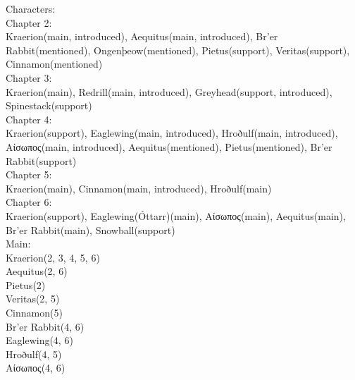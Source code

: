 



Characters:\\[1cm]
Chapter 2:\\[0.1cm]
Kraerion(main, introduced),
Aequitus(main, introduced),
Br'er Rabbit(mentioned),
Ongenþeow(mentioned),
Pietus(support),
Veritas(support),
Cinnamon(mentioned)\\[0.1cm]

Chapter 3:\\[0.1cm]
Kraerion(main),
Redrill(main, introduced),
Greyhead(support, introduced),
Spinestack(support)\\[1cm]

Chapter 4:\\[0.1cm]
Kraerion(support),
Eaglewing(main, introduced), 
Hroðulf(main, introduced), 
Αίσωπος(main, introduced),
Aequitus(mentioned),
Pietus(mentioned),
Br'er Rabbit(support)\\[0.1cm]

Chapter 5:\\[0.1cm]
Kraerion(main),
Cinnamon(main, introduced),
Hroðulf(main)\\[0.1cm]

Chapter 6:\\[0.1cm]
Kraerion(support),
Eaglewing(Óttarr)(main),
Αίσωπος(main),
Aequitus(main),
Br'er Rabbit(main),
Snowball(support)\\[0.1cm]

Main: \\[0.1cm]
Kraerion(2, 3, 4, 5, 6)\\
Aequitus(2, 6)\\
Pietus(2)\\
Veritas(2, 5)\\
Cinnamon(5)\\
Br'er Rabbit(4, 6)\\
Eaglewing(4, 6)\\
Hroðulf(4, 5)\\
Αίσωπος(4, 6)\\
 \\[0.1cm]